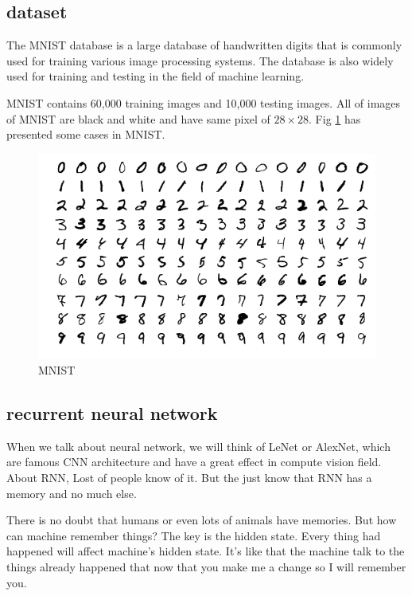 \documentclass[a4paper,10pt]{article}
\begin{document}
\subsection{dataset}
The MNIST database is a large database of handwritten digits that is commonly used for training various image processing systems. The database is also widely used for training and testing in the field of machine learning. 

MNIST contains 60,000 training images and 10,000 testing images. All of images of MNIST are black and white and have same pixel of $28\times28$. Fig \ref{Fig.MNIST} has presented some cases in MNIST. 
\begin{figure}[htpb]
\centering 
\includegraphics[width=1\textwidth]{report_image/mnist-all.png} 
\caption{MNIST} 
\label{Fig.MNIST} 
\end{figure}

\subsection{recurrent neural network}
When we talk about neural network, we will think of LeNet\cite{lecun1998gradient} or AlexNet\cite{krizhevsky2009learning}, which are famous CNN architecture and have a great effect in compute vision field. About RNN\cite{Elman90findingstructure}, Lost of people know of it. But the just know that RNN has a memory and no much else.

There is no doubt that humans or even lots of animals have memories. But how can machine remember things? The key is the hidden state. Every thing had happened will affect machine's hidden state. It's like that the machine talk to the things already happened that now that you make me a change so I will remember you.
\end{document}
